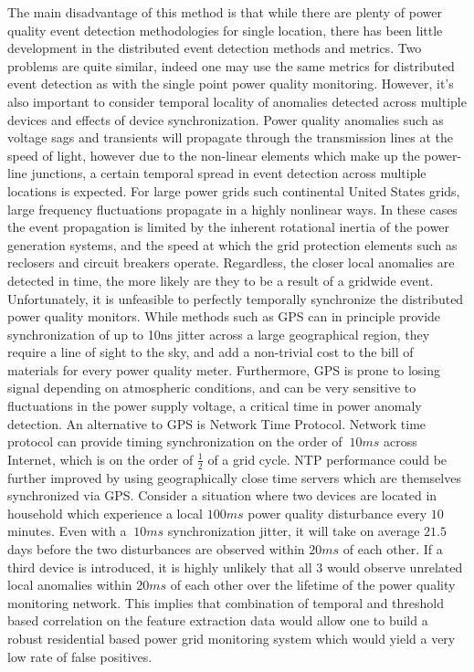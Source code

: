 The main disadvantage of this method is that while there are plenty of power quality event detection methodologies for single location, there has been little development in the distributed event detection methods and metrics. Two problems are quite similar, indeed one may use the same metrics for distributed event detection as with the single point power quality monitoring. However, it's also important to consider temporal locality of anomalies detected across multiple devices and effects of device synchronization. Power quality anomalies such as voltage sags and transients will propagate through the transmission lines at the speed of light, however due to the non-linear elements which make up the power-line junctions, a certain temporal spread in event detection across multiple locations is expected. For large power grids such continental United States grids, large frequency fluctuations propagate in a highly nonlinear ways. In these cases the event propagation is limited by the inherent rotational inertia of the power generation systems, and the speed at which the grid protection elements such as reclosers and circuit breakers operate. Regardless, the closer local anomalies are detected in time, the more likely are they to be a result of a gridwide event. Unfortunately, it is unfeasible to perfectly temporally synchronize the distributed power quality monitors. While methods such as GPS can in principle provide synchronization of up to 10ns jitter across a large geographical region, they require a line of sight to the sky, and add a non-trivial cost to the bill of materials for every power quality meter. Furthermore, GPS is prone to losing signal depending on atmospheric conditions, and can be very sensitive to fluctuations in the power supply voltage, a critical time in power anomaly detection. An alternative to GPS is Network Time Protocol. Network time protocol can provide timing synchronization on the order of $~10ms$ across Internet, which is on the order of $\frac{1}{2}$ of a grid cycle. NTP performance could be further improved by using geographically close time servers which are themselves synchronized via GPS. Consider a situation where two devices are located in household which experience a local $100ms$ power quality disturbance every $10$ minutes. Even with a $~10ms$ synchronization jitter, it will take on average $21.5$ days before the two disturbances are observed within $20ms$ of each other. If a third device is introduced, it is highly unlikely that all 3 would observe unrelated local anomalies within $20ms$ of each other over the lifetime of the power quality monitoring network. This implies that combination of temporal and threshold based correlation on the feature extraction data would allow one to build a robust residential based power grid monitoring system which would yield a very low rate of false positives. 

